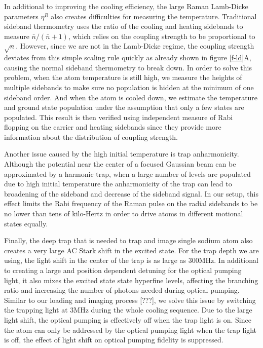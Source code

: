 \documentclass[aps,prl,twocolumn,groupedaddress]{revtex4-1}
\begin{document}
In additional to improving the cooling efficiency, the large Raman Lamb-Dicke parameters $\eta^R$
also creates difficulties for measuring the temperature. Traditional sideband thermometry uses
the ratio of the cooling and heating sidebands to measure $\bar n / (\bar n + 1)$, which relies
on the coupling strength to be proportional to $\sqrt{n}$. However, since we are not in the
Lamb-Dicke regime, the coupling strength deviates from this simple scaling rule quickly as already
shown in figure \ref{f-ld}A, causing the normal sideband thermometry to break down.
In order to solve this problem, when the atom temperature is still high,
we measure the heights of multiple sidebands to make sure no population is hidden at the
minimum of one sideband order. And when the atom is cooled down, we estimate the temperature
and ground state population under the assumption that only a few states are populated.
This result is then verified using independent measure of Rabi flopping on the carrier and heating
sidebands since they provide more information about the distribution of coupling strength.

Another issue caused by the high initial temperature is trap anharmonicity.
Although the potential near the center of a focused Gaussian beam can be approximated
by a harmonic trap, when a large number of levels are populated due to high initial temperature
the anharmonicity of the trap can lead to broadening of the sideband and decrease of
the sideband signal. In our setup, this effect limits the Rabi frequency of the Raman pulse
on the radial sidebands to be no lower than tens of kilo-Hertz in order to drive atoms in
different motional states equally.

Finally, the deep trap that is needed to trap and image single sodium atom also creates
a very large AC Stark shift in the excited state. For the trap depth we are using, the
light shift in the center of the trap is as large as $300\text{MHz}$.
In additional to creating a large and position dependent detuning for the optical pumping light,
it also mixes the excited state state hyperfine levels,
affecting the branching ratio and increasing the number of photons needed during optical pumping.
Similar to our loading and imaging process [???], we solve this issue by switching the
trapping light at $3\text{MHz}$ during the whole cooling sequence.
Due to the large light shift, the optical pumping is effectively off when the trap light is on.
Since the atom can only be addressed by the optical pumping light when the trap light is off,
the effect of light shift on optical pumping fidelity is suppressed.
\end{document}
